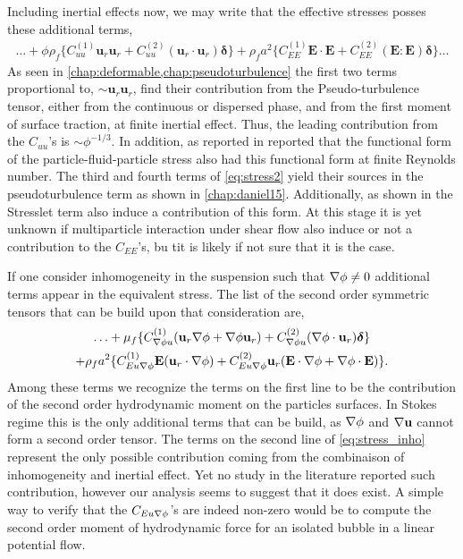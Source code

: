 Including inertial effects now, we may write that the effective stresses posses these additional terms,
\begin{multline}
    \ldots
    +\phi \rho_f \{ C_{uu}^{(1)}
    \textbf{u}_{r}\textbf{u}_{r} 
    + C_{uu}^{(2)} (\textbf{u}_{r}\cdot \textbf{u}_{r}) \bm\delta \}
    + 
    \rho_f a^2 \{ C_{EE}^{(1)} \textbf{E}\cdot \textbf{E}
    +  C_{EE}^{(2)} (\textbf{E} : \textbf{E})\bm\delta \}
    \ldots
    \label{eq:stress2}
\end{multline}
As seen in \ref{chap:deformable,chap:pseudoturbulence} the first two terms proportional to, $\sim \textbf{u}_{r}\textbf{u}_{r}$, find their contribution from the Pseudo-turbulence tensor, either from the continuous or dispersed phase, and from the first moment of surface traction, at finite inertial effect. 
Thus, the leading contribution from the $C_{uu}$'s is $\sim \phi^{-1/3}$. 
In addition, as reported in \citet{zhang2021stress} reported that the functional form of the particle-fluid-particle stress also had this functional form at finite Reynolds number. 
The third and fourth terms of \ref{eq:stress2} yield their sources in the pseudoturbulence term as shown in \ref{chap:daniel15}. 
Additionally, as shown in \citet{stone2001inertial} the Stresslet term also induce a contribution of this form. 
At this stage it is yet unknown if multiparticle interaction under shear flow also induce or not a contribution to the $C_{EE}$'s, bu tit is likely if not sure that it is the case. 

If one consider inhomogeneity in the suspension such that $\mathbf{\nabla} \phi \neq 0$ additional terms appear in the equivalent stress.  
The list of the second order symmetric tensors that can be build upon that consideration are, 
\begin{multline}
    \ldots 
    +  \mu_f \{
    C_{\grad \phi u}^{(1)}
    (\textbf{u}_{r}
    \grad \phi 
    + 
    \grad \phi 
    \textbf{u}_{r}) 
    +C_{\grad \phi u}^{(2)} (\grad \phi \cdot 
    \textbf{u}_{r})\bm\delta \}\\
    +\rho_f a^2 \{
    C_{Eu \grad \phi}^{(1)} \textbf{E} (\textbf{u}_r\cdot \grad \phi) 
    + C_{Eu \grad \phi}^{(2)}  \textbf{u}_r (\textbf{E}\cdot\grad \phi+ \grad \phi\cdot \textbf{E})
    \}.
    \label{eq:stress_inho}
\end{multline}
Among these terms we recognize the terms on the first line to be the contribution of the second order hydrodynamic moment on the particles surfaces. 
In Stokes regime this is the only additional terms that can be build, as $\mathbf{\nabla} \phi$ and $\mathbf{\nabla} \textbf{u}$ cannot form a second order tensor. 
The terms on the second line of \ref{eq:stress_inho} represent the only possible contribution coming from the combinaison of inhomogeneity and inertial effect. 
Yet no study in the literature reported such contribution, however our analysis seems to suggest that it does exist.
A simple way to verify that the $C_{Eu \mathbf{\nabla} \phi}$'s are indeed non-zero would be to compute the second order moment of hydrodynamic force for an isolated bubble in a linear potential flow. 

